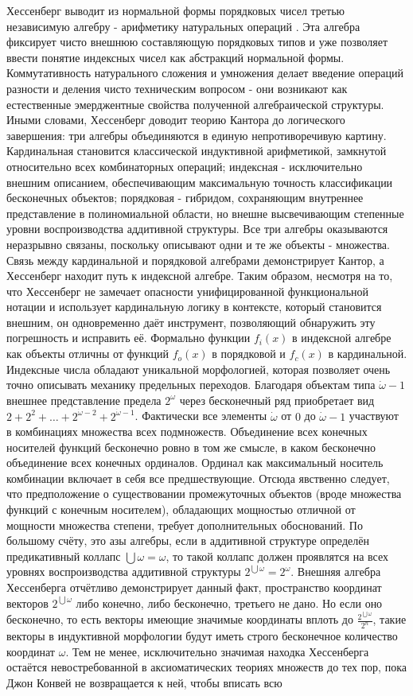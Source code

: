 \documentclass[12pt]{article}
\begin{document}
Хессенберг выводит из нормальной формы порядковых чисел третью независимую алгебру - арифметику натуральных операций \cite{hessenberg-sum}. Эта алгебра фиксирует чисто внешнюю составляющую порядковых типов и уже позволяет ввести понятие индексных чисел как абстракций нормальной формы. Коммутативность натурального сложения и умножения делает введение операций разности и деления чисто техническим вопросом - они возникают как естественные эмерджентные свойства полученной алгебраической структуры. Иными словами, Хессенберг доводит теорию Кантора до логического завершения: три алгебры объединяются в единую непротиворечивую картину. Кардинальная становится классической индуктивной арифметикой, замкнутой относительно всех комбинаторных операций; индексная - исключительно внешним описанием, обеспечивающим максимальную точность классификации бесконечных объектов; порядковая - гибридом, сохраняющим внутреннее представление в полиномиальной области, но внешне высвечивающим степенные уровни воспроизводства аддитивной структуры. Все три алгебры оказываются неразрывно связаны, поскольку описывают одни и те же объекты - множества. Связь между кардинальной и порядковой алгебрами демонстрирует Кантор, а Хессенберг находит путь к индексной алгебре. Таким образом, несмотря на то, что Хессенберг не замечает опасности унифицированной функциональной нотации и использует кардинальную логику в контексте, который становится внешним, он одновременно даёт инструмент, позволяющий обнаружить эту погрешность и исправить её. Формально функции $f_i(x)$ в индексной алгебре как объекты отличны от функций $f_o(x)$ в порядковой и $f_c(x)$ в кардинальной. Индексные числа обладают уникальной морфологией, которая позволяет очень точно описывать механику предельных переходов. Благодаря объектам типа $\dot{\omega} - 1$ внешнее представление предела $2^\omega$ через бесконечный ряд приобретает вид $2 + 2^2 + \dots + 2^{\dot{\omega} - 2} + 2^{\dot{\omega} - 1}$. Фактически все элементы $\dot{\omega}$ от $0$ до $\dot{\omega} - 1$ участвуют в комбинациях множества всех подмножеств. Объединение всех конечных носителей функций бесконечно ровно в том же смысле, в каком бесконечно объединение всех конечных ординалов. Ординал как максимальный носитель комбинации включает в себя все предшествующие. Отсюда явственно следует, что предположение о существовании промежуточных объектов (вроде множества функций с конечным носителем), обладающих мощностью отличной от мощности множества степени, требует дополнительных обоснований. По большому счёту, это азы алгебры, если в аддитивной структуре определён предикативный коллапс $\bigcup \omega = \omega$, то такой коллапс должен проявлятся на всех уровнях воспроизводства аддитивной структуры $2^{\bigcup \omega} = 2^{\omega}$. Внешняя алгебра Хессенберга отчётливо демонстрирует данный факт, пространство координат векторов $2^{\bigcup \omega}$ либо конечно, либо бесконечно, третьего не дано. Но если оно бесконечно, то есть векторы имеющие значимые координаты вплоть до $\frac{2^{\bigcup \omega}}{2^n}$, такие векторы в индуктивной морфологии будут иметь строго бесконечное количество координат $\omega$. Тем не менее, исключительно значимая находка Хессенберга остаётся невостребованной в аксиоматических теориях множеств до тех пор, пока Джон Конвей не возвращается к ней, чтобы вписать всю 
\end{document}
